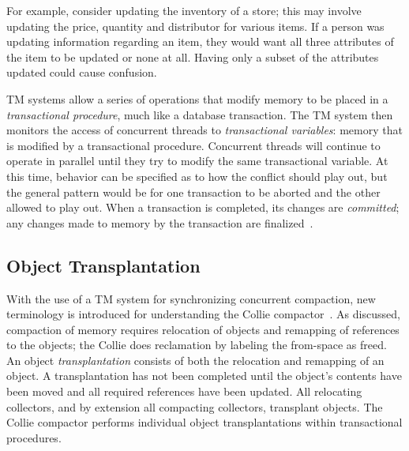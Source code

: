 \documentclass{sig-alternate}
\begin{document}
For example, consider updating the inventory of a store; this may involve updating
the price, quantity and distributor for various items. 
If a person was updating information regarding an item, they would 
want all three attributes of the item to be updated or none at all. Having
only a subset of the attributes updated could cause confusion.

TM systems allow a series
of operations that modify memory to be placed in
a \emph{transactional procedure}, much like a database transaction.
The TM system then monitors the access of concurrent threads to \emph{transactional variables}:
memory that is modified by a transactional procedure.
Concurrent threads will continue to operate in parallel until they try to modify
the same transactional variable. At this time, behavior can be specified as to how 
the conflict should play out, but the general pattern would be for one transaction
to be aborted and the other allowed to play out.
When a transaction is completed, its changes are \emph{committed}; any changes 
made to memory by the transaction are finalized~\cite{wiki:transactional-memory}.


\subsection{Object Transplantation}
\label{sec:collieTransplantation}

With the use of a TM system for synchronizing concurrent compaction,
new terminology is introduced for understanding the Collie 
compactor~\cite{Iyengar:Collie}. As discussed, compaction of
memory requires relocation of objects and remapping of references to
the objects; the Collie does reclamation by labeling the from-space as freed.
An object \emph{transplantation} consists of both the relocation and 
remapping of an object. A transplantation has not been completed until
the object's contents have been moved and all required references have been
updated. All relocating collectors, and by extension all
compacting collectors, transplant objects. The Collie compactor 
performs individual object transplantations within transactional procedures. 
\end{document}
